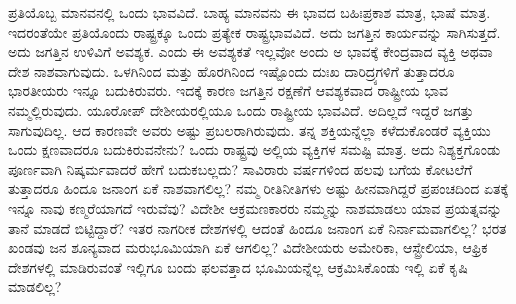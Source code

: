 ಪ್ರತಿಯೊಬ್ಬ ಮಾನವನಲ್ಲಿ ಒಂದು ಭಾವವಿದೆ. ಬಾಹ್ಯ ಮಾನವನು ಈ ಭಾವದ ಬಹಿಃಪ್ರಕಾಶ ಮಾತ್ರ, ಭಾಷೆ ಮಾತ್ರ. ಇದರಂತೆಯೇ ಪ್ರತಿಯೊಂದು ರಾಷ್ಟ್ರಕ್ಕೂ ಒಂದು ಪ್ರತ್ಯೇಕ ರಾಷ್ಟ್ರಭಾವವಿದೆ. ಅದು ಜಗತ್ತಿನ ಕಾರ್ಯವನ್ನು ಸಾಗಿಸುತ್ತದೆ. ಅದು ಜಗತ್ತಿನ ಉಳಿವಿಗೆ ಅವಶ್ಯಕ. ಎಂದು ಈ ಅವಶ್ಯಕತೆ ಇಲ್ಲವೋ ಅಂದು ಅ ಭಾವಕ್ಕೆ ಕೇಂದ್ರವಾದ ವ್ಯಕ್ತಿ ಅಥವಾ ದೇಶ ನಾಶವಾಗುವುದು. ಒಳಗಿನಿಂದ ಮತ್ತು ಹೊರಗಿನಿಂದ ಇಷ್ಟೊಂದು ದುಃಖ ದಾರಿದ್ರ್ಯಗಳಿಗೆ ತುತ್ತಾದರೂ ಭಾರತೀಯರು ಇನ್ನೂ ಬದುಕಿರುವರು. ಇದಕ್ಕೆ ಕಾರಣ ಜಗತ್ತಿನ ರಕ್ಷಣೆಗೆ ಆವಶ್ಯಕವಾದ ರಾಷ್ಟ್ರೀಯ ಭಾವ ನಮ್ಮಲ್ಲಿರುವುದು. ಯೂರೋಪ್​ ದೇಶೀಯರಲ್ಲಿಯೂ ಒಂದು ರಾಷ್ಟ್ರೀಯ ಭಾವವಿದೆ. ಅದಿಲ್ಲದೆ ಇದ್ದರೆ ಜಗತ್ತು ಸಾಗುವುದಿಲ್ಲ. ಆದ ಕಾರಣವೇ ಅವರು ಅಷ್ಟು ಪ್ರಬಲರಾಗಿರುವುದು. ತನ್ನ ಶಕ್ತಿಯನ್ನೆಲ್ಲಾ ಕಳೆದುಕೊಂಡರೆ ವ್ಯಕ್ತಿಯು ಒಂದು ಕ್ಷಣವಾದರೂ ಬದುಕಿರುವನೇನು? ಒಂದು ರಾಷ್ಟ್ರವು ಅಲ್ಲಿಯ ವ್ಯಕ್ತಿಗಳ ಸಮಷ್ಟಿ ಮಾತ್ರ. ಅದು ನಿಶ್ಯಕ್ತಗೊಂಡು ಪೂರ್ಣವಾಗಿ ನಿಷ್ಕರ್ಮವಾದರೆ ಹೇಗೆ ಬದುಕಬಲ್ಲದು? ಸಾವಿರಾರು ವರ್ಷಗಳಿಂದ ಹಲವು ಬಗೆಯ ಕೋಟಲೆಗೆ ತುತ್ತಾದರೂ ಹಿಂದೂ ಜನಾಂಗ ಏಕೆ ನಾಶವಾಗಲಿಲ್ಲ? ನಮ್ಮ ರೀತಿನೀತಿಗಳು ಅಷ್ಟು ಹೀನವಾಗಿದ್ದರೆ ಪ್ರಪಂಚದಿಂದ ಏತಕ್ಕೆ ಇನ್ನೂ ನಾವು ಕಣ್ಮರೆಯಾಗದೆ ಇರುವೆವು? ವಿದೇಶೀ ಆಕ್ರಮಣಕಾರರು ನಮ್ಮನ್ನು ನಾಶಮಾಡಲು ಯಾವ ಪ್ರಯತ್ನವನ್ನು ತಾನೆ ಮಾಡದೆ ಬಿಟ್ಟಿದ್ದಾರೆ? ಇತರ ನಾಗರೀಕ ದೇಶಗಳಲ್ಲಿ ಆದಂತೆ ಹಿಂದೂ ಜನಾಂಗ ಏಕೆ ನಿರ್ನಾಮವಾಗಲಿಲ್ಲ? ಭರತ ಖಂಡವು ಜನ ಶೂನ್ಯವಾದ ಮರುಭೂಮಿಯಾಗಿ ಏಕೆ ಆಗಲಿಲ್ಲ? ವಿದೇಶೀಯರು ಅಮೇರಿಕಾ, ಆಸ್ಟ್ರೇಲಿಯಾ, ಆಫ್ರಿಕ ದೇಶಗಳಲ್ಲಿ ಮಾಡಿರುವಂತೆ ಇಲ್ಲಿಗೂ ಬಂದು ಫಲವತ್ತಾದ ಭೂಮಿಯನ್ನೆಲ್ಲ ಆಕ್ರಮಿಸಿಕೊಂಡು ಇಲ್ಲಿ ಏಕೆ ಕೃಷಿ ಮಾಡಲಿಲ್ಲ?

